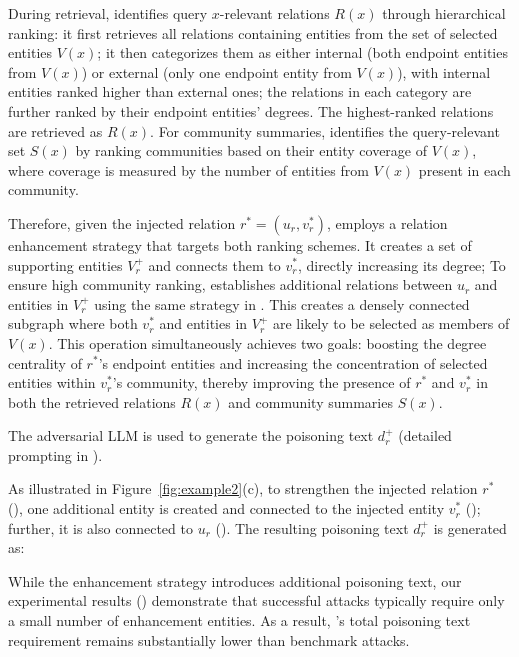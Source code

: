 During retrieval, \rag identifies query $x$-relevant relations $R(x)$ through hierarchical ranking: it first retrieves all relations containing entities from the set of selected entities $V(x)$; it then categorizes them as either internal (both endpoint entities from $V(x)$) or external (only one endpoint entity from $V(x)$), with internal entities ranked higher than external ones; the relations in each category are further ranked by their endpoint entities' degrees. The highest-ranked relations are retrieved as $R(x)$. 
For community summaries, \rag identifies the query-relevant set $S(x)$ by ranking communities based on their entity coverage of $V(x)$, where coverage is measured by the number of entities from $V(x)$ present in each community.


Therefore, given the injected relation $r^* = (u_r, v_r^*)$, \attack employs a relation enhancement strategy that targets both ranking schemes.  It creates a set of supporting entities $V_r^+$ and connects them to $v_r^*$, directly increasing its degree;  To ensure high community ranking, \attack establishes additional relations between $u_r$ and entities in $V_r^+$ using the same strategy in . This creates a densely connected subgraph where both $v_r^*$ and entities in $V_r^+$ are likely to be selected as members of $V(x)$. This operation simultaneously achieves two goals: boosting the degree centrality of $r^*$'s endpoint entities and increasing the concentration of selected entities within $v_r^*$'s community, thereby improving the presence of $r^*$ and $v^*_r$ in both the retrieved relations $R(x)$ and community summaries $S(x)$.

The adversarial LLM is used to generate the poisoning text $d_r^+$ (detailed prompting in ).



\begin{mtbox}{}
\begin{example} 
As illustrated in Figure~\ref{fig:example2}(c), to strengthen the injected relation $r^*$ (), one additional entity  is created and connected to the injected entity $v_r^*$ (); further, it is also connected to $u_r$ (). The resulting poisoning text $d_r^+$ is generated as:
\end{example}
\end{mtbox}
While the enhancement strategy introduces additional poisoning text, our experimental results () demonstrate that successful attacks typically require only a small number of enhancement entities. As a result, \attack's total poisoning text requirement remains substantially lower than benchmark attacks.



